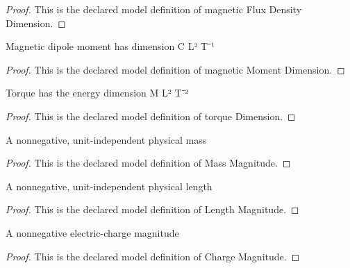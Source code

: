 \begin{proof}
  This is the declared model definition of magnetic Flux Density Dimension.
\end{proof}
\begin{definition}
  \label{def:physics:phyx-mini-0967:phyxminiproblems-problemphyxmini0967-magneticmomentdimension}
  Magnetic dipole moment has dimension C L² T⁻¹
\end{definition}
\begin{proof}
  This is the declared model definition of magnetic Moment Dimension.
\end{proof}
\begin{definition}
  \label{def:physics:phyx-mini-0967:phyxminiproblems-problemphyxmini0967-torquedimension}
  Torque has the energy dimension M L² T⁻²
\end{definition}
\begin{proof}
  This is the declared model definition of torque Dimension.
\end{proof}
\begin{definition}
  \label{def:physics:phyx-mini-0967:phyxminiproblems-problemphyxmini0967-massmagnitude}
  A nonnegative, unit-independent physical mass
\end{definition}
\begin{proof}
  This is the declared model definition of Mass Magnitude.
\end{proof}
\begin{definition}
  \label{def:physics:phyx-mini-0967:phyxminiproblems-problemphyxmini0967-lengthmagnitude}
  A nonnegative, unit-independent physical length
\end{definition}
\begin{proof}
  This is the declared model definition of Length Magnitude.
\end{proof}
\begin{definition}
  \label{def:physics:phyx-mini-0967:phyxminiproblems-problemphyxmini0967-chargemagnitude}
  A nonnegative electric-charge magnitude
\end{definition}
\begin{proof}
  This is the declared model definition of Charge Magnitude.
\end{proof}
